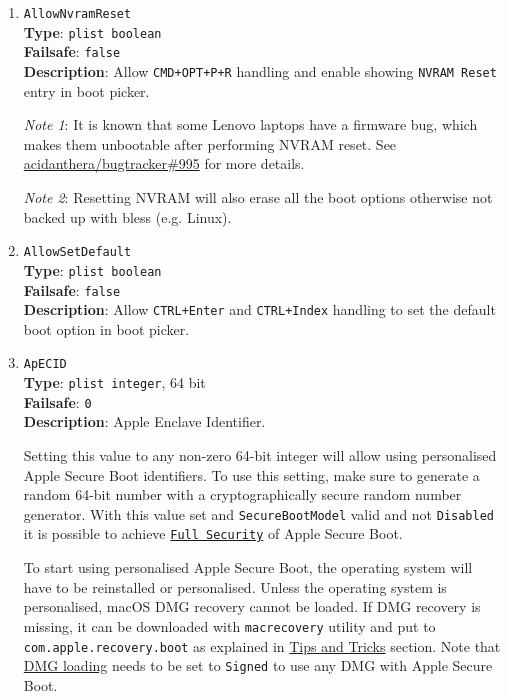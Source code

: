 \documentclass[]{article}
\begin{document}
\begin{enumerate}

\item
  \texttt{AllowNvramReset}\\
  \textbf{Type}: \texttt{plist\ boolean}\\
  \textbf{Failsafe}: \texttt{false}\\
  \textbf{Description}: Allow \texttt{CMD+OPT+P+R} handling and enable
  showing \texttt{NVRAM Reset} entry in boot picker.

  \emph{Note 1}: It is known that some Lenovo laptops have a firmware
  bug, which makes them unbootable after performing NVRAM reset. See
  \href{https://github.com/acidanthera/bugtracker/issues/995}{acidanthera/bugtracker\#995}
  for more details.

  \emph{Note 2}: Resetting NVRAM will also erase all the boot options
  otherwise not backed up with bless (e.g. Linux).

\item
  \texttt{AllowSetDefault}\\
  \textbf{Type}: \texttt{plist\ boolean}\\
  \textbf{Failsafe}: \texttt{false}\\
  \textbf{Description}: Allow \texttt{CTRL+Enter} and \texttt{CTRL+Index} handling
  to set the default boot option in boot picker.

\item
  \texttt{ApECID}\\
  \textbf{Type}: \texttt{plist\ integer}, 64 bit\\
  \textbf{Failsafe}: \texttt{0}\\
  \textbf{Description}: Apple Enclave Identifier.

  Setting this value to any non-zero 64-bit integer will allow using
  personalised Apple Secure Boot identifiers. To use this setting,
  make sure to generate a random 64-bit number with a cryptographically secure
  random number generator. With this value set and \texttt{SecureBootModel} valid
  and not \texttt{Disabled} it is possible to achieve
  \href{https://support.apple.com/en-us/HT208330}{\texttt{Full Security}} of Apple
  Secure Boot.

  To start using personalised Apple Secure Boot, the operating system will have
  to be reinstalled or personalised. Unless the operating system is personalised,
  macOS DMG recovery cannot be loaded. If DMG recovery is missing,
  it can be downloaded with \texttt{macrecovery} utility and put to
  \texttt{com.apple.recovery.boot} as explained in
  \hyperref[reinstallmacos]{Tips and Tricks} section. Note that
  \hyperref[securedmgloading]{DMG loading} needs to be set to \texttt{Signed}
  to use any DMG with Apple Secure Boot.


\end{enumerate}
\end{document}
